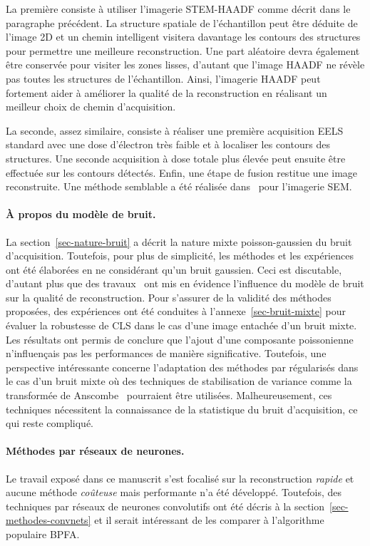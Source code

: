 La première consiste à utiliser l'imagerie STEM-HAADF comme décrit dans le paragraphe précédent. La structure spatiale de l'échantillon peut être déduite de l'image 2D et un chemin intelligent visitera davantage les contours des structures pour permettre une meilleure reconstruction. Une part aléatoire devra également être conservée pour visiter les zones lisses, d'autant que l'image HAADF ne révèle pas toutes les structures de l'échantillon. Ainsi, l'imagerie HAADF peut fortement aider à améliorer la qualité de la reconstruction en réalisant un meilleur choix de chemin d'acquisition.

La seconde, assez similaire, consiste à réaliser une première acquisition EELS standard avec une dose d'électron très faible et à localiser les contours des structures. Une seconde acquisition à dose totale plus élevée peut ensuite être effectuée sur les contours détectés. Enfin, une étape de fusion restitue une image reconstruite. Une méthode semblable a été réalisée dans~\cite{dahmen2016feature} pour l'imagerie SEM. 


\paragraph{\`A propos du modèle de bruit.} La section~\ref{sec-nature-bruit} a décrit la nature mixte poisson-gaussien du bruit d'acquisition. Toutefois, pour plus de simplicité, les méthodes et les expériences ont été élaborées en ne considérant qu'un bruit gaussien. Ceci est discutable, d'autant plus que des travaux~\cite{sanders2020inpainting} ont mis en évidence l'influence du modèle de bruit sur la qualité de reconstruction. Pour s'assurer de la validité des méthodes proposées, des expériences ont été conduites à l'annexe~\ref{sec-bruit-mixte} pour évaluer la robustesse de CLS dans le cas d'une image entachée d'un bruit mixte. Les résultats ont permis de conclure que l'ajout d'une composante poissonienne n'influençais pas les performances de manière significative. Toutefois, une perspective intéressante concerne l'adaptation des méthodes par  régularisés dans le cas d'un bruit mixte où des techniques de stabilisation de variance comme la transformée de Anscombe~\cite{anscombe1948transformation} pourraient être utilisées. Malheureusement, ces techniques nécessitent la connaissance de la statistique du bruit d'acquisition, ce qui reste compliqué.


\paragraph{Méthodes par réseaux de neurones.} Le travail exposé dans ce manuscrit s'est focalisé sur la reconstruction \emph{rapide} et aucune méthode \emph{coûteuse} mais performante n'a été développé. Toutefois, des techniques par réseaux de neurones convolutifs ont été décris à la section~\ref{sec-methodes-convnets} et il serait intéressant de les comparer à l'algorithme populaire BPFA.






